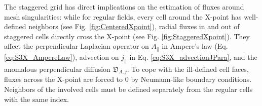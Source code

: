 The staggered grid has direct implications on the estimation of fluxes around mesh singularities: while for regular fields, every cell around the X-point has well-defined neighbors (see Fig. \ref{fig:CenteredXpoint}), radial fluxes in and out of staggered cells directly cross the X-point (see Fig. \ref{fig:StaggeredXpoint}). They affect the perpendicular Laplacian operator on $A_\parallel$ in Ampere's law (Eq. \ref{eq:S3X_AmpereLaw}), advection on $j_\parallel$ in Eq. \ref{eq:S3X_advectionJPara}, and the anomalous perpendicular diffusion $\mathfrak{D}_{A,j}$. To cope with the ill-defined cell faces, fluxes across the X-point are forced to 0 by Neumann-like boundary conditions. Neighbors of the involved cells must be defined separately from the regular cells with the same index. \newline

